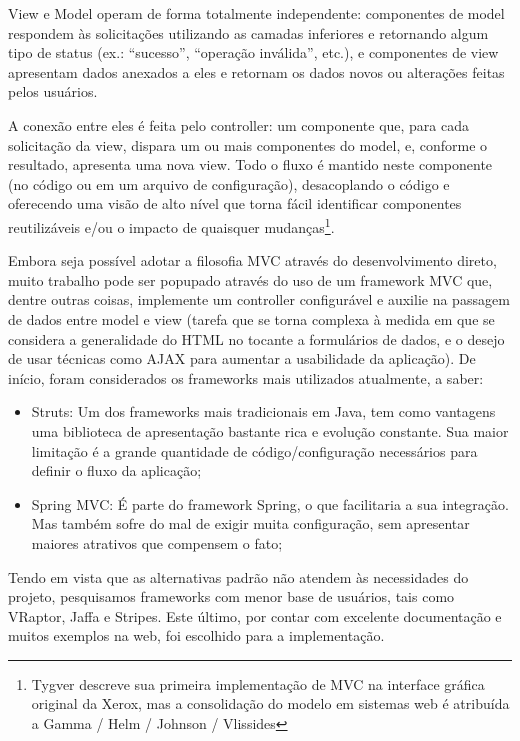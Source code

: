 \documentclass{abnt}
\begin{document}
View e Model operam de forma totalmente independente: componentes de model respondem às solicitações utilizando as camadas inferiores e retornando algum tipo de status (ex.: “sucesso”, “operação inválida”, etc.), e componentes de view apresentam dados anexados a eles e retornam os dados novos ou alterações feitas pelos usuários.

A conexão entre eles é feita pelo controller: um componente que, para cada solicitação da view, dispara um ou mais componentes do model, e, conforme o resultado, apresenta uma nova view. Todo o fluxo é mantido neste componente (no código ou em um arquivo de configuração), desacoplando o código e oferecendo uma visão de alto nível que torna fácil identificar componentes reutilizáveis e/ou o impacto de quaisquer mudanças\footnote{Tygver\cite{Tygver} descreve sua primeira implementação de MVC na interface gráfica original da Xerox, mas a consolidação do modelo em sistemas web é atribuída a Gamma / Helm / Johnson / Vlissides\cite{Gamma1995}}.

Embora seja possível adotar a filosofia MVC através do desenvolvimento direto, muito trabalho pode ser popupado através do uso de um framework MVC que, dentre outras coisas, implemente um controller configurável e auxilie na passagem de dados entre model e view (tarefa que se torna complexa à medida em que se considera a generalidade do HTML no tocante a formulários de dados, e o desejo de usar técnicas como AJAX para aumentar a usabilidade da aplicação). De início, foram considerados os frameworks mais utilizados atualmente, a saber:

\begin{itemize}
\item Struts: Um dos frameworks mais tradicionais em Java, tem como vantagens uma biblioteca de apresentação bastante rica e evolução constante. Sua maior limitação é a grande quantidade de código/configuração necessários para definir o fluxo da aplicação;
\item Spring MVC: É parte do framework Spring, o que facilitaria a sua integração. Mas também sofre do mal de exigir muita configuração, sem apresentar maiores atrativos que compensem o fato;
\end{itemize}

Tendo em vista que as alternativas padrão não atendem às necessidades do projeto, pesquisamos frameworks com menor base de usuários, tais como VRaptor, Jaffa e Stripes. Este último, por contar com excelente documentação e muitos exemplos na web, foi escolhido para a implementação.
\end{document}
